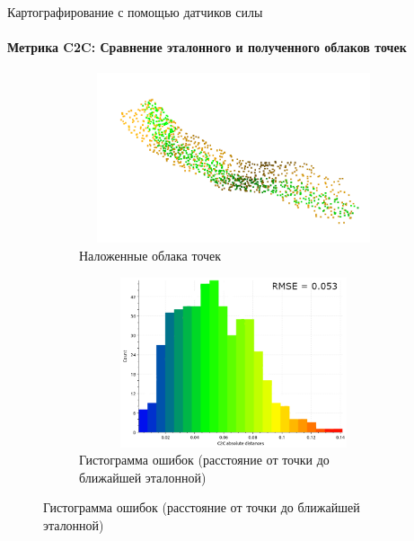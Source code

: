 \documentclass[aspectratio=169,xcolor=table]{beamer}
\begin{document}
\begin{frame}[t]{Картографирование с помощью датчиков силы}
    \framesubtitle{Метрика C2C: Сравнение эталонного и полученного облаков точек}
    \vspace{-15pt}
    \begin{figure}[H]
        \begin{subfigure}[t]{0.49\textwidth}
            \centering\includegraphics[height=5cm,width=1\textwidth,keepaspectratio]{cropped_pcd.png}
            \caption*{Наложенные облака точек}
        \end{subfigure}
        \begin{subfigure}[t]{0.49\textwidth}
            \centering\includegraphics[height=5cm,width=1\textwidth,keepaspectratio]{pcd_hist.png}
            \caption*{Гистограмма ошибок (расстояние от точки до ближайшей эталонной)}
        \end{subfigure}
    \end{figure}
\end{frame}
\end{document}
